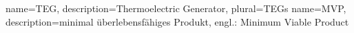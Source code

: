 %
{
  name=TEG,
  description={Thermoelectric Generator},
  plural=TEGs
}
%
{  
  name=MVP,
  description={minimal überlebensfähiges Produkt, engl.: Minimum Viable
Product}
}